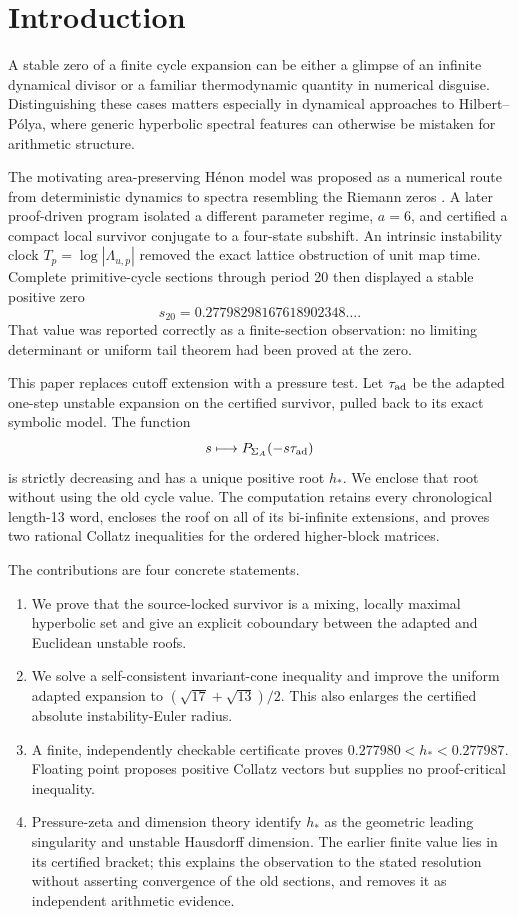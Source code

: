 \section{Introduction}
\label{sec:introduction}

A stable zero of a finite cycle expansion can be either a glimpse of an
infinite dynamical divisor or a familiar thermodynamic quantity in numerical
disguise.  Distinguishing these cases matters especially in dynamical
approaches to Hilbert--P\'olya, where generic hyperbolic spectral features can
otherwise be mistaken for arithmetic structure.

The motivating area-preserving H\'enon model was proposed as a numerical route
from deterministic dynamics to spectra resembling the Riemann zeros
\citep{Wang2026HenonModel}.  A later proof-driven program isolated a different
parameter regime, \(a=6\), and certified a compact local survivor conjugate to
a four-state subshift.  An intrinsic instability clock
\(T_p=\log|\Lambda_{u,p}|\) removed the exact lattice obstruction of unit map
time.  Complete primitive-cycle sections through period 20 then displayed a
stable positive zero
\[
  s_{20}=0.27798298167618902348\ldots .
\]
That value was reported correctly as a finite-section observation: no limiting
determinant or uniform tail theorem had been proved at the zero.

This paper replaces cutoff extension with a pressure test.  Let \(\tau_{\mathrm{ad}}\) be
the adapted one-step unstable expansion on the certified survivor, pulled
back to its exact symbolic model.  The function
\[
  s\longmapsto P_{\Sigma_A}(-s\tau_{\mathrm{ad}})
\]
is strictly decreasing and has a unique positive root \(h_*\).  We enclose
that root without using the old cycle value.  The computation retains every
chronological length-13 word, encloses the roof on all of its bi-infinite
extensions, and proves two rational Collatz inequalities for the ordered
higher-block matrices.

The contributions are four concrete statements.

\begin{enumerate}[leftmargin=2em]
  \item We prove that the source-locked survivor is a mixing, locally maximal
  hyperbolic set and give an explicit coboundary between the adapted and
  Euclidean unstable roofs.
  \item We solve a self-consistent invariant-cone inequality and improve the
  uniform adapted expansion to
  \((\sqrt{17}+\sqrt{13})/2\).  This also enlarges the certified absolute
  instability-Euler radius.
  \item A finite, independently checkable certificate proves
  \(0.277980<h_*<0.277987\).  Floating point proposes positive Collatz
  vectors but supplies no proof-critical inequality.
  \item Pressure-zeta and dimension theory identify \(h_*\) as the geometric
  leading singularity and unstable Hausdorff dimension.  The earlier finite
  value lies in its certified bracket; this explains the observation to the
  stated resolution without asserting convergence of the old sections, and
  removes it as independent arithmetic evidence.
\end{enumerate}

